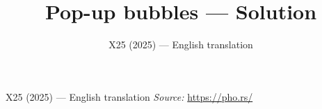 \documentclass[11pt,a4paper]{article}
\title{\textbf{Pop-up bubbles --- Solution}}
\author{\normalsize X25 (2025) — English translation}
\date{}
\begin{document}
\maketitle
X25 (2025) — English translation
\vspace{1em}
\noindent\textit{Source:} \url{https://pho.rs/}
\end{document}

